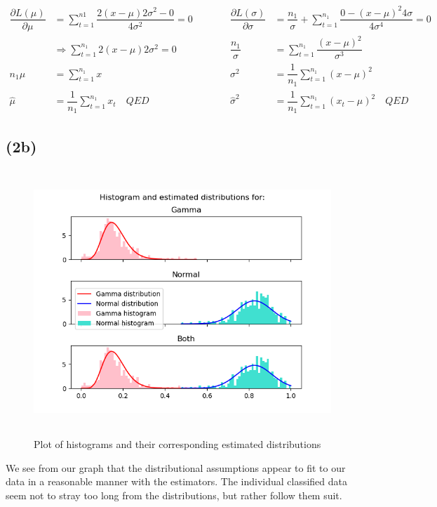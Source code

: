 \documentclass[12pt, letterpaper]{article}
\begin{document}
      \begin{align*}
        \dfrac{\partial L(\mu)}{\partial \mu} & =\sum_{t=1}^{n1}\dfrac{2(x - \mu)2\sigma^2 - 0}{4\sigma^2} = 0 \quad&\quad\quad \dfrac{\partial L(\sigma)}{\partial\sigma} & = \dfrac{n_1}{\sigma} + \sum_{t=1}^{n_1} \dfrac{0 - (x - \mu)^2 4\sigma}{4\sigma^4}  = 0
        \\
        & \Rightarrow \sum_{t=1}^{n_1} 2(x - \mu)2\sigma^2 = 0 \quad&\quad\quad
        \dfrac{n_1}{\sigma} & = \sum_{t=1}^{n_1} \dfrac{(x-\mu)^2}{\sigma^3}
        \\
        n_1\mu & = \sum_{t=1}^{n_1} x \quad&\quad\quad \sigma^2 &= \dfrac{1}{n_1}\sum_{t=1}^{n_1} (x-\mu)^2
        \\
        \hat{\mu} & = \dfrac{1}{n_1}\sum_{t=1}^{n_1} x_t \quad QED &\quad\quad
        \hat{\sigma}^2 &= \dfrac{1}{n_1}\sum_{t=1}^{n_1} (x_t-\mu)^2 \quad QED
      \end{align*}
    \subsection*{(2b)}
      \begin{figure}[h]
        \caption{Plot of histograms and their corresponding estimated distributions}
        \centering
        \includegraphics[width=14cm, height=10cm]{histograms}
      \end{figure}
      We see from our graph that the distributional assumptions appear to fit to our data in a reasonable manner with the estimators. The individual classified data seem not to stray too long from the distributions, but rather follow them suit.
\end{document}
